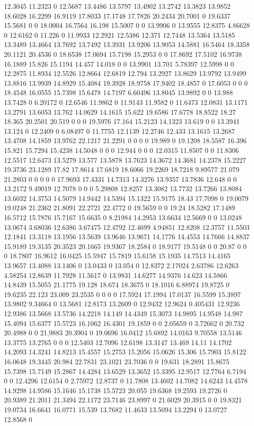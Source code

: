 12.3045 11.2323 0 12.5687 13.4486 13.5797 13.4902 13.2742 13.3823 13.9852 18.6028 16.2299 16.9119 17.8033 17.1748 17.7826 20.2434 20.7001 0 19.6337 15.5681 0 0 18.0004 16.7564 16.198 15.5007 0 0 13.9906 0 13.9555 12.8375 4.86628 0 12.6162 0 11.226 0 11.9933 12.2921 12.5386 12.371 12.7448 13.5364 13.5185 13.3489 13.4664 13.7692 13.7492 13.3931 13.9206 13.9053 14.5881 16.5464 18.3358 20.1121 20.4536 0 18.6538 17.0694 15.7198 15.2953 0 0 17.8692 17.5102 16.9738 16.1889 15.826 15.1194 14.457 14.018 0 0 13.9901 13.701 5.78397 12.5998 0 0 12.2875 11.8934 12.5526 12.8664 12.6819 12.794 13.2927 13.8629 13.9792 13.9499 13.8816 13.9939 14.8929 15.4084 19.3928 18.9758 17.9402 18.4857 0 17.6053 0 0 0 18.4548 16.0555 15.7398 15.6478 14.7197 6.60496 13.8045 13.9892 0 0 13.988 13.7428 0 6.20172 0 12.6546 11.9862 0 11.9143 11.9582 0 11.6473 12.0831 13.1171 13.2791 13.6053 13.762 14.0629 14.1615 15.622 19.6586 17.6778 18.8522 18.27 18.365 20.2501 20.519 0 0 0 19.5976 17.164 15.2123 14.1323 13.619 0 0 13.3941 13.124 0 12.2409 0 6.08497 0 11.7755 12.1139 12.2746 12.433 13.1615 13.2687 13.4708 14.1859 13.9762 22.1217 21.2291 0 0 0 0 19.989 0 19.1208 18.5587 16.396 15.821 15.7294 15.4238 14.5048 0 0 0 12.944 0 0 0 12.0315 11.8507 0 0 11.8306 12.5517 12.6473 13.5279 13.577 13.5878 13.7623 14.3672 14.3681 14.2378 15.2227 19.3736 23.1289 17.82 17.8614 17.6819 18.6066 19.2269 18.7218 9.89577 21.079 21.2803 0 0 0 0 0 17.9693 17.4331 14.7313 14.3276 13.9357 13.7836 12.648 0 0 13.2172 9.49019 12.7078 0 0 0 5.29808 12.8257 13.3082 13.7732 13.7266 13.8084 13.6032 14.3753 14.5079 14.9442 14.5394 15.1322 15.9175 18.43 17.7098 0 19.0079 19.0248 21.2362 21.8091 22.2721 22.4772 0 19.5659 0 0 19.24 18.5282 17.1489 16.5712 15.7876 15.7167 15.6635 0 8.21984 14.2953 13.6634 12.5669 0 0 13.0248 13.0674 3.68036 12.6386 3.67475 12.4792 12.4699 4.94851 12.8208 12.3757 11.5503 12.1841 13.3118 13.1956 13.5639 13.9646 13.9671 14.1776 14.4553 14.7666 14.8837 15.9189 19.3135 20.3523 20.1665 19.9367 18.2584 0 18.9177 19.5148 0 0 20.87 0 0 0 18.7807 16.9612 16.0425 15.5947 15.7819 15.6158 15.1935 14.7513 14.4165 13.9657 13.4088 13.1406 0 13.0433 0 13.054 0 12.8372 2.17024 2.63786 12.6263 4.58254 12.8639 11.7928 11.5617 0 13.9831 14.6277 14.9376 14.623 14.5866 14.8439 15.5055 21.1775 19.128 18.674 18.3675 0 18.1016 6.88974 19.8725 0 19.6235 22.123 23.009 23.2535 0 0 0 0 17.5924 17.1994 17.0137 16.5599 15.3897 13.9802 9.34664 0 13.5681 12.8173 13.2609 0 12.9432 12.9624 0.405431 12.9236 12.9386 13.5668 13.5736 14.2218 14.149 14.4349 15.3073 14.9895 14.9548 14.987 15.4094 15.6377 15.5723 16.1062 16.4301 19.1859 0 0 2.05659 0 3.72662 0 20.732 20.4988 0 0 21.9883 20.3904 0 19.0696 16.0412 15.6892 14.0163 9.70558 13.5146 13.3775 13.2765 0 0 0 12.5403 12.7096 12.6198 13.3147 13.469 14.11 14.1702 14.2093 14.3241 14.8213 15.4557 15.2753 15.2056 15.0626 15.306 15.7903 15.8122 16.0648 19.3445 20.984 22.7831 23.1021 23.7036 0 0 19.631 18.2891 15.8675 15.7398 15.7149 15.2867 14.4284 13.6529 13.3652 15.3395 12.9517 12.7764 6.7194 0 0 12.4296 12.6154 0 2.75972 12.8737 0 11.7808 13.4602 14.7082 14.6243 14.4578 14.9298 14.9586 15.1646 15.1738 15.5723 20.055 19.6368 19.2593 19.2726 0 20.9389 21.2011 21.3494 22.1172 23.7146 23.8997 0 21.6029 20.3915 0 0 19.8321 19.0734 16.6641 16.0771 15.539 13.7682 11.4633 13.5094 13.2294 0 13.0727 12.8568 0 